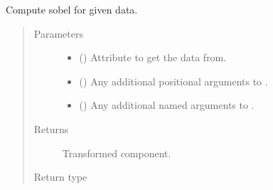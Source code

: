 \documentclass[letterpaper,10pt,english]{sphinxmanual}
\begin{document}
\begin{fulllineitems}
\begin{fulllineitems}
\label{\detokenize{api/rock:geology.src.Rock.sobel}}
Compute sobel for given data.
\begin{quote}\begin{description}
\item[{Parameters}] \leavevmode\begin{itemize}
\item {} 
 (\sphinxstyleliteralemphasis{\sphinxupquote{, }}) \textendash{} Attribute to get the data from.

\item {} 
 () \textendash{} Any additional positional arguments to .

\item {} 
 () \textendash{} Any additional named arguments to .

\end{itemize}

\item[{Returns}] \leavevmode
{} \textendash{} Transformed component.

\item[{Return type}] \leavevmode
{\hyperref[\detokenize{api/base_classes:geology.src.base_spatial.SpatialComponent}]{}}

\end{description}\end{quote}

\end{fulllineitems}



\end{fulllineitems}
\end{document}
